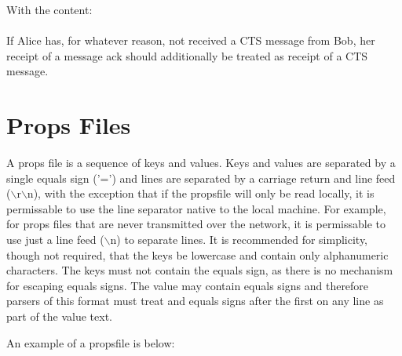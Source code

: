 \documentclass[12pt,a4paper]{article}
\begin{document}
With the content:\\

 \\

If Alice has, for whatever reason, not received a
CTS message from Bob, her receipt of a message ack should additionally be treated as receipt of a
CTS message.

\appendix

\section{Props Files}
\label{PropsFile}
A props file is a sequence of keys and values. Keys and values are separated by a single equals sign
('=') and lines are separated by a carriage return and line feed ($\backslash$r$\backslash$n), with
the exception that if the propsfile will only be read locally, it is permissable to use the line
separator native to the local machine. For example, for props files that are never transmitted over
the network, it is permissable to use just a line feed ($\backslash$n) to separate lines. It is
recommended for simplicity, though not required, that the keys be lowercase and contain only
alphanumeric characters. The keys must not contain the equals sign, as there is no mechanism for
escaping equals signs. The value may contain equals signs and therefore parsers of this format must
treat and equals signs after the first on any line as part of the value text.

An example of a propsfile is below: \\
\\
\end{document}
